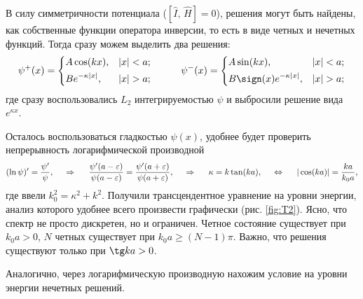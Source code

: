В силу симметричности потенциала ($[\hat{I},\, \hat{H}] = 0$), решения могут быть найдены, как собственные функции оператора инверсии, то есть в виде четных и нечетных функций. Тогда сразу можем выделить два решения:
\begin{equation*}
    \psi^+(x) = \left\{\begin{aligned}
         & A \cos(k x), &|x| < a; \\
         & B e^{- \kappa |x|}, &|x|>a;
    \end{aligned}\right.
    \hspace{10 mm}
    \psi^- (x) = 
    \left\{\begin{aligned}
         & A \sin(k x), & |x| < a; \\
        & B \sign(x) e^{- \kappa |x|}, & |x| > a;
    \end{aligned}\right.
\end{equation*}
где сразу воспользовались $L_2$ интегрируемостью $\psi$ и выбросили решение вида $e^{\kappa x}$.




Осталось воспользоваться гладкостью $\psi(x)$, удобнее будет проверить непрерывность логарифмической производной
\begin{equation*}
    (\ln \psi)' = \frac{\psi'}{\psi},
    \hspace{0.5cm} \Rightarrow \hspace{0.5cm}
    \frac{\psi'(a-\varepsilon)}{\psi(a - \varepsilon)} = \frac{\psi'(a+\varepsilon)}{\psi(a+\varepsilon)},
    \hspace{0.5cm} \Rightarrow \hspace{0.5cm}
    \kappa = k \tan(ka),
    \hspace{5 mm}  \Leftrightarrow \hspace{5 mm} 
    |\cos(ka)| = \frac{ka}{k_0 a},
\end{equation*}
где ввели $k_0^2 = \kappa^2 + k^2$. Получили трансцендентное уравнение на уровни энергии, анализ которого удобнее всего произвести графически (рис. \ref{fig:T2}). Ясно, что спектр не просто дискретен, но и ограничен. Четное состояние существует при $k_0 a > 0$, $N$ четных существует при $k_0 a \geq (N-1) \pi$. Важно, что решения существуют только при $\tg k a > 0$.

Аналогично, через логарифмическую производную нахожим условие на уровни энергии нечетных решений.

